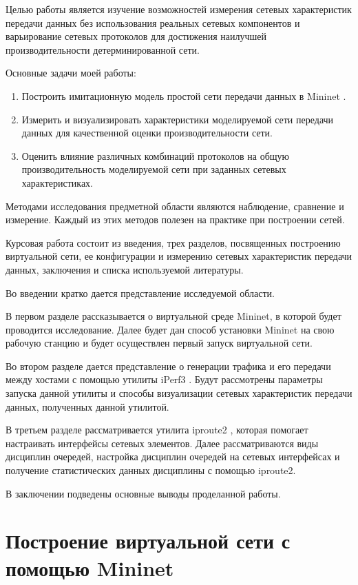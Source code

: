 \documentclass[
  13pt,
  fontsize=13pt,
  russian,
  a4paper,
,captions=tableheading
]{scrreprt}
\providecommand{\tightlist}{%
  \setlength{\itemsep}{0pt}\setlength{\parskip}{0pt}}
\begin{document}
Целью работы является изучение возможностей измерения сетевых
характеристик передачи данных без использования реальных сетевых
компонентов и варьирование сетевых протоколов для достижения наилучшей
производительности детерминированной сети.

Основные задачи моей работы:

\begin{enumerate}
\def\labelenumi{\arabic{enumi}.}
\tightlist
\item
  Построить имитационную модель простой сети передачи данных в Mininet
  \autocite{mininet}.
\item
  Измерить и визуализировать характеристики моделируемой сети передачи
  данных для качественной оценки производительности сети.
\item
  Оценить влияние различных комбинаций протоколов на общую
  производительность моделируемой сети при заданных сетевых
  характеристиках.
\end{enumerate}

Методами исследования предметной области являются наблюдение, сравнение
и измерение. Каждый из этих методов полезен на практике при построении
сетей.

Курсовая работа состоит из введения, трех разделов, посвященных
построению виртуальной сети, ее конфигурации и измерению сетевых
характеристик передачи данных, заключения и списка используемой
литературы.

Во введении кратко дается представление исследуемой области.

В первом разделе рассказывается о виртуальной среде Mininet, в которой
будет проводится исследование. Далее будет дан способ установки Mininet
на свою рабочую станцию и будет осуществлен первый запуск виртуальной
сети.

Во втором разделе дается представление о генерации трафика и его
передачи между хостами с помощью утилиты iPerf3 \autocite{iperf}. Будут
рассмотрены параметры запуска данной утилиты и способы визуализации
сетевых характеристик передачи данных, полученных данной утилитой.

В третьем разделе рассматривается утилита iproute2 \autocite{iproute},
которая помогает настраивать интерфейсы сетевых элементов. Далее
рассматриваются виды дисциплин очередей, настройка дисциплин очередей на
сетевых интерфейсах и получение статистических данных дисциплины с
помощью iproute2.

В заключении подведены основные выводы проделанной работы.

\hypertarget{ux43fux43eux441ux442ux440ux43eux435ux43dux438ux435-ux432ux438ux440ux442ux443ux430ux43bux44cux43dux43eux439-ux441ux435ux442ux438-ux441-ux43fux43eux43cux43eux449ux44cux44e-mininet}{%
\chapter{Построение виртуальной сети с помощью
Mininet}\label{ux43fux43eux441ux442ux440ux43eux435ux43dux438ux435-ux432ux438ux440ux442ux443ux430ux43bux44cux43dux43eux439-ux441ux435ux442ux438-ux441-ux43fux43eux43cux43eux449ux44cux44e-mininet}}
\end{document}
